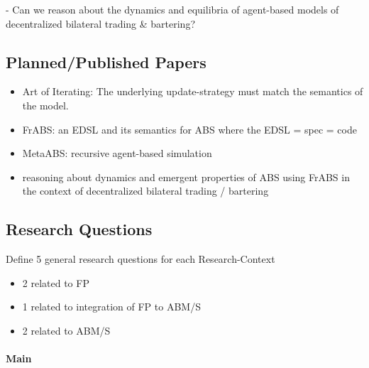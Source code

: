 		- Can we reason about the dynamics and equilibria of agent-based models of decentralized bilateral trading \& bartering?

\subsection{Planned/Published Papers}
\begin{itemize}
	\item Art of Iterating: The underlying update-strategy must match the semantics of the model.
	\item FrABS: an EDSL and its semantics for ABS where the EDSL = spec = code
	\item MetaABS: recursive agent-based simulation
	\item reasoning about dynamics and emergent properties of ABS using FrABS in the context of decentralized bilateral trading / bartering
\end{itemize}


\subsection{Research Questions}
Define 5 general research questions for each Research-Context
	\begin{itemize}
    \item 2 related to FP
    \item 1 related to integration of FP to ABM/S
    \item 2 related to ABM/S
    \end{itemize}

\paragraph{Main} 
